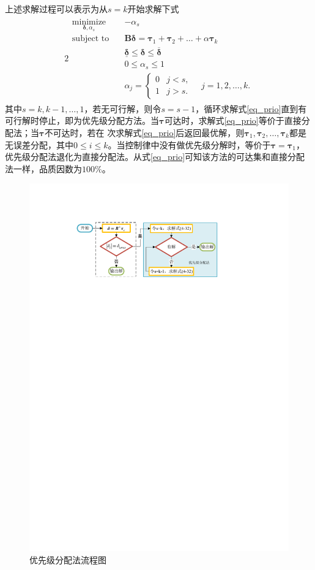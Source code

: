 上述求解过程可以表示为从$s=k$开始求解下式	
\begin{alignat}{2}
\begin{split}
\mathop {{\text{minimize}}}\limits_{\bm{\delta},\alpha_s}\quad&{-\alpha_s} \\
\mbox{subject to}\quad
&\bm{B}\bm{\delta}=\bm{\tau}_1+\bm{\tau}_2+\ldots+\alpha\bm{\tau}_{k} \\
&\underline{\bm{\delta}} \leq \bm{\delta} \leq \overline{\bm{\delta}} \\
&0 \leq \alpha_s \leq 1   \\
&\alpha_j={\begin{cases}
	0 &  j<s,\\
	1 &  j>s.
	\end{cases}\quad j=1,2, \ldots, k.}
\end{split} \label{eq_prio}
\end{alignat}
其中$s=k,k-1,\ldots ,1$，若无可行解，则令$s=s-1$，循环求解式\eqref{eq_prio}直到有可行解时停止，即为优先级分配方法。当$\bm{\tau}$可达时，求解式\eqref{eq_prio}等价于直接分配法；当$\bm{\tau}$不可达时，若在 次求解式\eqref{eq_prio}后返回最优解，则$\bm{\tau}_1,\bm{\tau}_2,\ldots,\bm{\tau}_k$都是无误差分配，其中$0\le i\le k$。当控制律中没有做优先级分解时，等价于$\bm{\tau}=\bm{\tau}_1$，优先级分配法退化为直接分配法。从式\eqref{eq_prio}可知该方法的可达集和直接分配法一样，品质因数为$100\%$。
\begin{figure}[htbp]
	\centering	
	\includegraphics[scale=1]{Fig/Fig5.pdf}
	\caption{\label{fig_sequence}优先级分配法流程图}
\end{figure}
